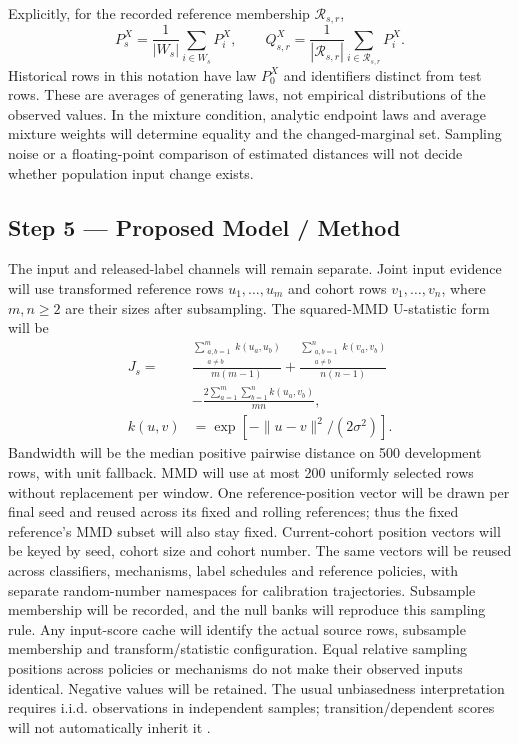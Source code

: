 \documentclass[11pt,a4paper]{article}
\begin{document}
Explicitly, for the recorded reference membership $\mathcal R_{s,r}$,
\begin{equation}
P_s^X=\frac{1}{|W_s|}\sum_{i\in W_s}P_i^X,\qquad
Q_{s,r}^X=\frac{1}{|\mathcal R_{s,r}|}
 \sum_{i\in\mathcal R_{s,r}}P_i^X.
\end{equation}
Historical rows in this notation have law $P_0^X$ and identifiers distinct
from test rows. These are averages of generating laws, not empirical
distributions of the observed values. In the mixture condition, analytic
endpoint laws and average mixture weights will determine equality and the
changed-marginal set. Sampling noise or a floating-point comparison of
estimated distances will not decide whether population input change exists.

\subsection*{Step 5 --- Proposed Model / Method}
The input and released-label channels will remain separate. Joint input evidence
will use transformed reference rows $u_1,\ldots,u_m$ and cohort rows
$v_1,\ldots,v_n$, where $m,n\geq2$ are their sizes after subsampling.
The squared-MMD U-statistic form will be
\begin{align}
J_s={}&\frac{\sum_{\substack{a,b=1\\a\ne b}}^m k(u_a,u_b)}{m(m-1)}
+\frac{\sum_{\substack{a,b=1\\a\ne b}}^n k(v_a,v_b)}{n(n-1)}\nonumber\\
&-\frac{2\sum_{a=1}^m\sum_{b=1}^n k(u_a,v_b)}{mn},\\
k(u,v)&=\exp[-\|u-v\|^2/(2\sigma^2)].
\end{align}
Bandwidth will be the median positive pairwise distance on 500 development rows,
with unit fallback. MMD will use at most 200 uniformly selected rows without
replacement per window. One reference-position vector will be drawn per final
seed and reused across its fixed and rolling references; thus the fixed
reference's MMD subset will also stay fixed. Current-cohort position vectors
will be keyed by seed, cohort size and cohort number. The same vectors will
be reused across classifiers, mechanisms, label schedules and reference
policies, with separate random-number namespaces for calibration trajectories.
Subsample membership will be recorded, and the null banks will reproduce this
sampling rule. Any input-score cache will identify the actual source rows,
subsample membership and transform/statistic configuration. Equal relative
sampling positions across policies or mechanisms do not make their observed
inputs identical. Negative values will be retained. The usual unbiasedness interpretation requires i.i.d.
observations in independent samples; transition/dependent scores will not
automatically inherit it \cite{gretton}.
\end{document}
